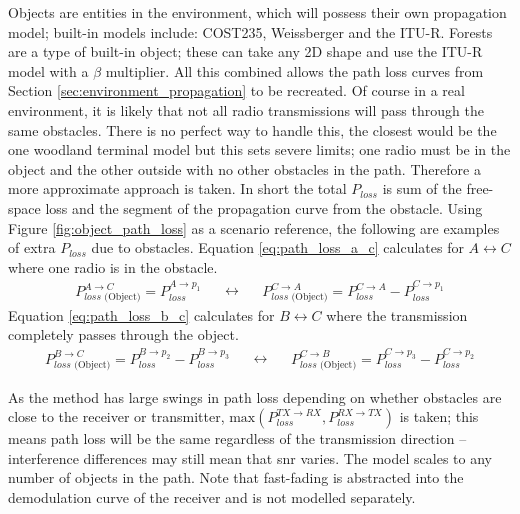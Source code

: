 Objects are entities in the environment, which will possess their own propagation model; built-in models include: COST235, Weissberger and the ITU-R. Forests are a type of built-in object; these can take any 2D shape and use the ITU-R model with a $\beta$ multiplier. All this combined allows the path loss curves from Section \ref{sec:environment_propagation} to be recreated. Of course in a real environment, it is likely that not all radio transmissions will pass through the same obstacles. There is no perfect way to handle this, the closest would be the one woodland terminal model \cite{3YP:RF_BOOK} but this sets severe limits; one radio must be in the object and the other outside with no other obstacles in the path. Therefore a more approximate approach is taken. In short the total $P_{loss}$ is sum of the free-space loss and the segment of the propagation curve from the obstacle.  Using Figure \ref{fig:object_path_loss} as a scenario reference, the following are examples of extra $P_{loss}$ due to obstacles. Equation \ref{eq:path_loss_a_c} calculates for $A\leftrightarrow C$ where one radio is in the obstacle.
    	\begin{equation}
    	\label{eq:path_loss_a_c}
    	\begin{split}
    	    	P_{loss \text{ (Object)}}^{A\rightarrow C} = P_{loss}^{A\rightarrow p_1}
    	\end{split}
    	\quad\leftrightarrow\quad
    	\begin{split}
    		    P_{loss \text{ (Object)}}^{C\rightarrow A} = P_{loss}^{C\rightarrow A}-P_{loss}^{C\rightarrow p_1}
    	\end{split}
    	\end{equation}
    	Equation \ref{eq:path_loss_b_c} calculates for $B\leftrightarrow C$ where the transmission completely passes through the object.
    	\begin{equation}
    	\label{eq:path_loss_b_c}
    	\begin{split}
    	        P_{loss \text{ (Object)}}^{B\rightarrow C} = P_{loss}^{B\rightarrow p_2}-P_{loss}^{B\rightarrow p_3}	
    	\end{split}
    	\quad\leftrightarrow\quad
    	\begin{split}
    	    	P_{loss \text{ (Object)}}^{C\rightarrow B} = P_{loss}^{C\rightarrow p_3}-P_{loss}^{C\rightarrow p_2}
    	\end{split}
    	\end{equation}
    
    As the method has large swings in path loss depending on whether obstacles are close to the receiver or transmitter, $\text{max}(P_{loss}^{TX\rightarrow RX}, P_{loss}^{RX\rightarrow TX})$ is taken; this means path loss will be the same regardless of the transmission direction -- interference differences may still mean that \ac{snr} varies. The model scales to any number of objects in the path. Note that fast-fading is abstracted into the demodulation curve of the receiver and is not modelled separately.  	


